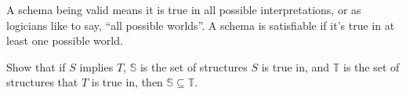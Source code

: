 \begin{aside}
    A schema being valid means it is true in all possible interpretations, or as logicians like to say, ``all possible worlds''. A schema is satisfiable if it's true in at least one possible world. 

    Show that if $S$ implies $T$, $\mathbb{S}$ is the set of structures $S$ is true in, and $\mathbb{T}$ is the set of structures that $T$ is true in, then $\mathbb{S} \subseteq \mathbb{T}$.  
\end{aside}